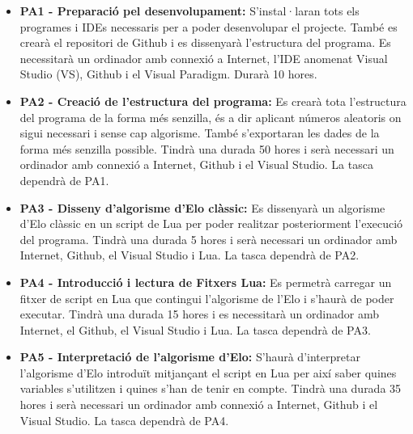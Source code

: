 \documentclass[a4paper]{article}
\newcounter{subsubsubsection}[subsubsection]
\begin{document}
\begin{itemize}
    \item \textbf{PA1 - Preparació pel desenvolupament:} S'instal·laran tots els programes i IDEs necessaris per a poder desenvolupar el projecte. També es crearà el repositori de Github i es dissenyarà l'estructura del programa. Es necessitarà un ordinador amb connexió a Internet, l'IDE anomenat Visual Studio (VS), Github i el Visual Paradigm. Durarà 10 hores.
    \item \textbf{PA2 - Creació de l'estructura del programa:} Es crearà tota l'estructura del programa de la forma més senzilla, és a dir aplicant números aleatoris on sigui necessari i sense cap algorisme. També s'exportaran les dades de la forma més senzilla possible. Tindrà una durada 50 hores i serà necessari un ordinador amb connexió a Internet, Github i el Visual Studio. La tasca dependrà de PA1.
    \item \textbf{PA3 - Disseny d'algorisme d'Elo clàssic:} Es dissenyarà un algorisme d'Elo clàssic en un script de Lua per poder realitzar posteriorment l'execució del programa. Tindrà una durada 5 hores i serà necessari un ordinador amb Internet, Github, el Visual Studio i Lua. La tasca dependrà de PA2.
    \item \textbf{PA4 - Introducció i lectura de Fitxers Lua:} Es permetrà carregar un fitxer de script en Lua que contingui l'algorisme de l'Elo i s'haurà de poder executar. Tindrà una durada 15 hores i es necessitarà un ordinador amb Internet, el Github, el Visual Studio i Lua. La tasca dependrà de PA3.
    \item \textbf{PA5 - Interpretació de l'algorisme d'Elo:} S'haurà d'interpretar l'algorisme d'Elo introduït mitjançant el script en Lua per així saber quines variables s'utilitzen i quines s'han de tenir en compte. Tindrà una durada 35 hores i serà necessari un ordinador amb connexió a Internet, Github i el Visual Studio. La tasca dependrà de PA4.
\end{itemize}
\end{document}
